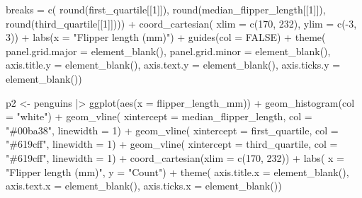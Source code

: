 \documentclass[
  letterpaper,
  DIV=11,
  numbers=noendperiod]{scrreprt}
\newenvironment{Shaded}{\begin{snugshade}}{\end{snugshade}}
\newcommand{\AttributeTok}[1]{\textcolor[rgb]{0.40,0.45,0.13}{#1}}
\newcommand{\ConstantTok}[1]{\textcolor[rgb]{0.56,0.35,0.01}{#1}}
\newcommand{\DecValTok}[1]{\textcolor[rgb]{0.68,0.00,0.00}{#1}}
\newcommand{\FunctionTok}[1]{\textcolor[rgb]{0.28,0.35,0.67}{#1}}
\newcommand{\NormalTok}[1]{\textcolor[rgb]{0.00,0.23,0.31}{#1}}
\newcommand{\OtherTok}[1]{\textcolor[rgb]{0.00,0.23,0.31}{#1}}
\newcommand{\SpecialCharTok}[1]{\textcolor[rgb]{0.37,0.37,0.37}{#1}}
\newcommand{\StringTok}[1]{\textcolor[rgb]{0.13,0.47,0.30}{#1}}
\begin{document}
\begin{Shaded}
\begin{Highlighting}[]
    \AttributeTok{breaks =} \FunctionTok{c}\NormalTok{(}
      \FunctionTok{round}\NormalTok{(first\_quartile[[}\DecValTok{1}\NormalTok{]]),}
      \FunctionTok{round}\NormalTok{(median\_flipper\_length[[}\DecValTok{1}\NormalTok{]]),}
      \FunctionTok{round}\NormalTok{(third\_quartile[[}\DecValTok{1}\NormalTok{]]))) }\SpecialCharTok{+}
  \FunctionTok{coord\_cartesian}\NormalTok{(}
    \AttributeTok{xlim =} \FunctionTok{c}\NormalTok{(}\DecValTok{170}\NormalTok{, }\DecValTok{232}\NormalTok{),}
    \AttributeTok{ylim =} \FunctionTok{c}\NormalTok{(}\SpecialCharTok{{-}}\DecValTok{3}\NormalTok{, }\DecValTok{3}\NormalTok{)) }\SpecialCharTok{+}
  \FunctionTok{labs}\NormalTok{(}\AttributeTok{x =} \StringTok{"Flipper length (mm)"}\NormalTok{) }\SpecialCharTok{+}
  \FunctionTok{guides}\NormalTok{(}\AttributeTok{col =} \ConstantTok{FALSE}\NormalTok{) }\SpecialCharTok{+}
  \FunctionTok{theme}\NormalTok{(}
    \AttributeTok{panel.grid.major =} \FunctionTok{element\_blank}\NormalTok{(),}
    \AttributeTok{panel.grid.minor =} \FunctionTok{element\_blank}\NormalTok{(),}
    \AttributeTok{axis.title.y =} \FunctionTok{element\_blank}\NormalTok{(),}
    \AttributeTok{axis.text.y =} \FunctionTok{element\_blank}\NormalTok{(),}
    \AttributeTok{axis.ticks.y =} \FunctionTok{element\_blank}\NormalTok{())}

\NormalTok{p2 }\OtherTok{\textless{}{-}}\NormalTok{ penguins }\SpecialCharTok{|\textgreater{}} 
  \FunctionTok{ggplot}\NormalTok{(}\FunctionTok{aes}\NormalTok{(}\AttributeTok{x =}\NormalTok{ flipper\_length\_mm)) }\SpecialCharTok{+} 
  \FunctionTok{geom\_histogram}\NormalTok{(}\AttributeTok{col =} \StringTok{"white"}\NormalTok{) }\SpecialCharTok{+}
  \FunctionTok{geom\_vline}\NormalTok{(}
    \AttributeTok{xintercept =}\NormalTok{ median\_flipper\_length,}
    \AttributeTok{col =} \StringTok{"\#00ba38"}\NormalTok{,}
    \AttributeTok{linewidth =} \DecValTok{1}\NormalTok{) }\SpecialCharTok{+}
  \FunctionTok{geom\_vline}\NormalTok{(}
    \AttributeTok{xintercept =}\NormalTok{ first\_quartile,}
    \AttributeTok{col =} \StringTok{"\#619cff"}\NormalTok{,}
    \AttributeTok{linewidth =} \DecValTok{1}\NormalTok{) }\SpecialCharTok{+}
  \FunctionTok{geom\_vline}\NormalTok{(}
    \AttributeTok{xintercept =}\NormalTok{ third\_quartile,}
    \AttributeTok{col =} \StringTok{"\#619cff"}\NormalTok{,}
    \AttributeTok{linewidth =} \DecValTok{1}\NormalTok{) }\SpecialCharTok{+}
  \FunctionTok{coord\_cartesian}\NormalTok{(}\AttributeTok{xlim =} \FunctionTok{c}\NormalTok{(}\DecValTok{170}\NormalTok{, }\DecValTok{232}\NormalTok{)) }\SpecialCharTok{+}
  \FunctionTok{labs}\NormalTok{(}
    \AttributeTok{x =} \StringTok{"Flipper length (mm)"}\NormalTok{,}
    \AttributeTok{y =} \StringTok{"Count"}\NormalTok{) }\SpecialCharTok{+}
  \FunctionTok{theme}\NormalTok{(}
    \AttributeTok{axis.title.x =} \FunctionTok{element\_blank}\NormalTok{(), }
    \AttributeTok{axis.text.x =} \FunctionTok{element\_blank}\NormalTok{(),}
    \AttributeTok{axis.ticks.x =} \FunctionTok{element\_blank}\NormalTok{())}



\end{Highlighting}
\end{Shaded}
\end{document}
